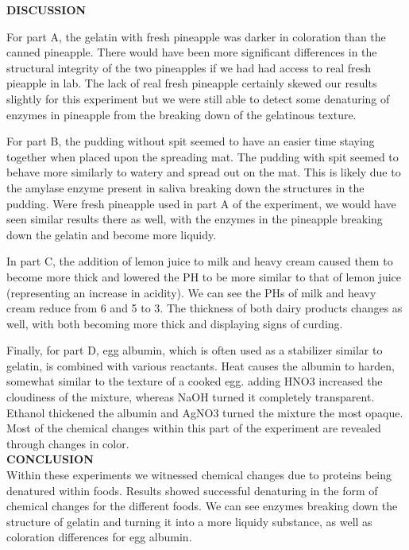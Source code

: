 \documentclass[12pt]{article}
\begin{document}
\newpage

\textbf{DISCUSSION}

\setlength{\parindent}{0.5in}
For part A, the gelatin with fresh pineapple was darker in coloration than the canned pineapple.
There would have been more significant differences in the structural integrity of the two pineapples if
we had had access to real fresh pieapple in lab. The lack of real fresh pineapple certainly skewed our 
results slightly for this experiment but we were still able to detect some denaturing of enzymes in pineapple 
from the breaking down of the gelatinous texture.
\par
For part B, the pudding without spit seemed to have an easier time staying together when placed upon the 
spreading mat. The pudding with spit seemed to behave more similarly to watery and spread out on the mat.
This is likely due to the amylase enzyme present in saliva breaking down the structures in the pudding.
Were fresh pineapple used in part A of the experiment, we would have seen similar results there as well, 
with the enzymes in the pineapple breaking down the gelatin and become more liquidy.
\par
In part C, the addition of lemon juice to milk and heavy cream caused them to become more thick and 
lowered the PH to be more similar to that of lemon juice (representing an increase in acidity).
We can see the PHs of milk and heavy cream 
reduce from 6 and 5 to 3. The thickness of both dairy products changes as well, with both becoming more 
thick and displaying signs of curding.

Finally, for part D, egg albumin, which is often used as a stabilizer similar to gelatin, is combined with
various reactants. Heat causes the albumin to harden, somewhat similar to the texture of a cooked egg.
adding HNO3 increased the cloudiness of the mixture, whereas NaOH turned it completely transparent.
Ethanol thickened the albumin and AgNO3 turned the mixture the most opaque. Most of the chemical changes
within this part of the experiment are revealed through changes in color.\\

\setlength{\parindent}{0in}
\textbf{CONCLUSION}\\
Within these experiments we witnessed chemical changes due to proteins being denatured within foods.
Results showed successful denaturing in the form of chemical changes for the different foods.
We can see enzymes breaking down the structure of gelatin and turning it into a more liquidy substance,
as well as coloration differences for egg albumin.
\end{document}
